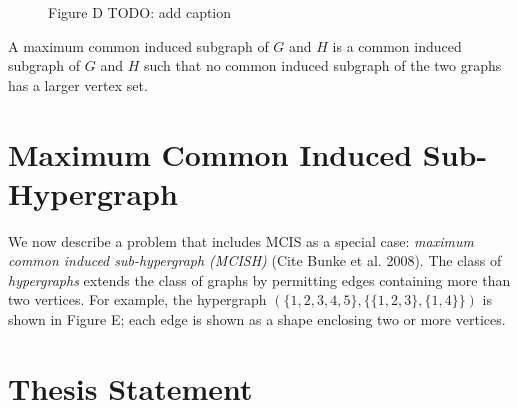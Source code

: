 \begin{figure}[h!]
\centering
{}
\qquad
{}
\caption{Figure D TODO: add caption}
\end{figure}

A maximum common induced subgraph of $G$ and $H$ is a common induced subgraph of $G$
and $H$ such that no common induced subgraph of the two graphs has a larger
vertex set.

\section{Maximum Common Induced Sub-Hypergraph}

We now describe a problem that includes MCIS as a special case: \emph{maximum common
induced sub-hypergraph (MCISH)} (Cite Bunke et al. 2008). The class of
\emph{hypergraphs} extends the class of graphs by permitting edges containing more
than two vertices. For example, the hypergraph $(\{1,2,3,4,5\}, \{\{1,2,3\}, \{1,4\}\})$
is shown in Figure E; each edge is shown as a shape enclosing two or more
vertices.

\section{Thesis Statement}
\label{c:intro:thesisstatement}


